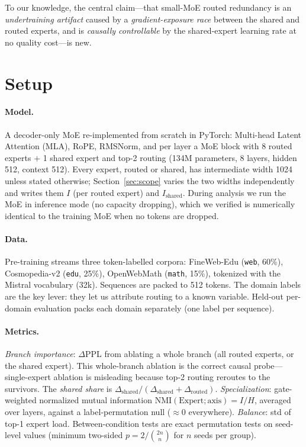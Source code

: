\documentclass[11pt]{article}
\begin{document}
To our knowledge, the central claim---that small-MoE routed redundancy is an \emph{undertraining
artifact} caused by a \emph{gradient-exposure race} between the shared and routed experts, and is
\emph{causally controllable} by the shared-expert learning rate at no quality cost---is new.

\section{Setup}\label{sec:setup}

\paragraph{Model.} A decoder-only MoE re-implemented from scratch in PyTorch: Multi-head Latent
Attention (MLA), RoPE, RMSNorm, and per layer a MoE block with 8 routed experts $+$ 1 shared
expert and top-2 routing (134M parameters, 8 layers, hidden 512, context 512). Every expert, routed
or shared, has intermediate width 1024 unless stated otherwise; Section~\ref{sec:scope} varies the
two widths independently and writes them $I$ (per routed expert) and $I_{\mathrm{shared}}$. During
analysis we run the MoE in inference mode (no capacity dropping), which we verified is numerically
identical to the training MoE when no tokens are dropped.

\paragraph{Data.} Pre-training streams three token-labelled corpora: FineWeb-Edu (\texttt{web},
60\%), Cosmopedia-v2 (\texttt{edu}, 25\%), OpenWebMath (\texttt{math}, 15\%), tokenized with the
Mistral vocabulary (32k). Sequences are packed to 512 tokens. The domain labels are the key lever:
they let us attribute routing to a known variable. Held-out per-domain evaluation packs each domain
separately (one label per sequence).

\paragraph{Metrics.} \emph{Branch importance}: $\Delta$PPL from ablating a whole branch (all routed
experts, or the shared expert). This whole-branch ablation is the correct causal probe---single-expert
ablation is misleading because top-2 routing reroutes to the survivors. The \emph{shared share} is
$\Delta_{\text{shared}}/(\Delta_{\text{shared}}+\Delta_{\text{routed}})$. \emph{Specialization}:
gate-weighted normalized mutual information $\mathrm{NMI}(\text{Expert};\text{axis})=I/H$, averaged
over layers, against a label-permutation null ($\approx 0$ everywhere). \emph{Balance}: std of top-1
expert load. Between-condition tests are exact permutation tests on seed-level values (minimum
two-sided $p=2/\binom{2n}{n}$ for $n$ seeds per group).
\end{document}
